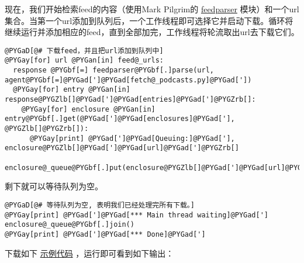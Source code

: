 \documentclass[letterpaper,10pt,english]{manual}
\begin{document}
现在，我们开始检索feed的内容（使用Mark Pilgrim的 \href{http://www.feedparser.org/}{feedparser} 模块）和一个url集合。当第一个url添加到队列后，一个工作线程即可选择它并启动下载。循环将继续运行并添加相应的feed，直到全部加完，工作线程将轮流取出url去下载它们。

\begin{Verbatim}[commandchars=@\[\]]
@PYGaD[@# 下载feed，并且把url添加到队列中]
@PYGay[for] url @PYGan[in] feed@_urls:
  response @PYGbf[=] feedparser@PYGbf[.]parse(url, agent@PYGbf[=]@PYGad[']@PYGad[fetch@_podcasts.py]@PYGad['])
  @PYGay[for] entry @PYGan[in] response@PYGZlb[]@PYGad[']@PYGad[entries]@PYGad[']@PYGZrb[]:
    @PYGay[for] enclosure @PYGan[in] entry@PYGbf[.]get(@PYGad[']@PYGad[enclosures]@PYGad['], @PYGZlb[]@PYGZrb[]):
      @PYGay[print] @PYGad[']@PYGad[Queuing:]@PYGad['], enclosure@PYGZlb[]@PYGad[']@PYGad[url]@PYGad[']@PYGZrb[]
      enclosure@_queue@PYGbf[.]put(enclosure@PYGZlb[]@PYGad[']@PYGad[url]@PYGad[']@PYGZrb[])
\end{Verbatim}

剩下就可以等待队列为空。

\begin{Verbatim}[commandchars=@\[\]]
@PYGaD[@# 等待队列为空, 表明我们已经处理完所有下载。]
@PYGay[print] @PYGad[']@PYGad[*** Main thread waiting]@PYGad[']
enclosure@_queue@PYGbf[.]join()
@PYGay[print] @PYGad[']@PYGad[*** Done]@PYGad[']
\end{Verbatim}

下载如下 \href{http://www.doughellmann.com/PyMOTW/fetch\_podcasts.py}{示例代码} ，运行即可看到如下输出：
\end{document}
